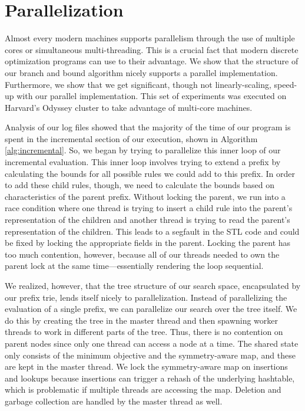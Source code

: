 \section{Parallelization}
Almost every modern machines supports parallelism through the use of multiple cores or simultaneous multi-threading.
This is a crucial fact that modern discrete optimization programs can use to their advantage.
We show that the structure of our branch and bound algorithm nicely supports a parallel implementation.
Furthermore, we show that we get significant, though not linearly-scaling, speed-up with our parallel implementation.
This set of experiments was executed on Harvard's Odyssey cluster to take advantage of multi-core machines.

Analysis of our log files showed that the majority of the time of our program is spent in the incremental section of our execution, shown in Algorithm \ref{alg:incremental}.
So, we began by trying to parallelize this inner loop of our incremental evaluation.
This inner loop involves trying to extend a prefix by calculating the bounds for all possible rules we could add to this prefix.
In order to add these child rules, though, we need to calculate the bounds based on characteristics of the parent prefix.
Without locking the parent, we run into a race condition where one thread is trying to insert a child rule into the parent's representation of the children and another thread is trying to read the parent's representation of the children.
This leads to a segfault in the STL code and could be fixed by locking the appropriate fields in the parent.
Locking the parent has too much contention, however, because all of our threads needed to own the parent lock at the same time---essentially rendering the loop sequential.

We realized, however, that the tree structure of our search space, encapsulated by our prefix trie, lends itself nicely to parallelization.
Instead of parallelizing the evaluation of a single prefix, we can parallelize our search over the tree itself.
We do this by creating the tree in the master thread and then spawning worker threads to work in different parts of the tree.
Thus, there is no contention on parent nodes since only one thread can access a node at a time.
The shared state only consists of the minimum objective and the symmetry-aware map, and these are kept in the master thread.
We lock the symmetry-aware map on insertions and lookups because insertions can trigger a rehash of the underlying hashtable, which is problematic if multiple threads are accessing the map. 
Deletion and garbage collection are handled by the master thread as well.

